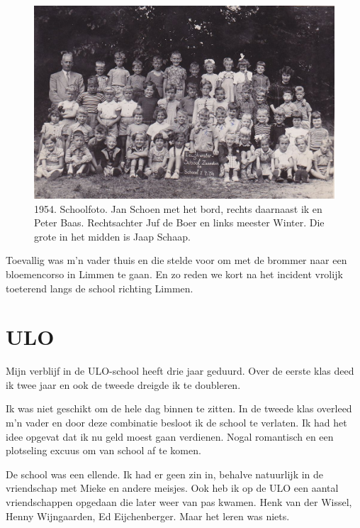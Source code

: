 \documentclass[12pt,twoside, openright]{memoir}
\begin{document}
\begin{figure}
\centering
\includegraphics[width=\textwidth]{img/ch18/lwschool}
\caption*{\footnotesize 1954. Schoolfoto. Jan Schoen met het bord, rechts daarnaast ik en Peter Baas. Rechtsachter Juf de Boer en links meester Winter. Die grote in het midden is Jaap Schaap.}
\end{figure}

Toevallig was m’n vader thuis en die stelde voor om met de brommer naar een bloemencorso in Limmen te gaan. En zo reden we kort na het incident vrolijk toeterend langs de school richting Limmen. 


\section*{ULO} %
\label{cha:ulo}

Mijn verblijf in de ULO-school heeft drie jaar geduurd. Over de eerste klas deed ik twee jaar en ook de tweede dreigde ik te doubleren. 

Ik was niet geschikt om de hele dag binnen te zitten. In de tweede klas overleed m’n vader en door deze combinatie besloot ik de school te verlaten. Ik had het idee opgevat dat ik nu geld moest gaan verdienen. Nogal romantisch en een plotseling excuus om van school af te komen.  

De school was een ellende. Ik had er geen zin in, behalve natuurlijk in de vriendschap met Mieke en andere meisjes. Ook heb ik op de ULO een aantal vriendschappen opgedaan die later weer van pas kwamen. Henk van der Wissel, Henny Wijngaarden, Ed Eijchenberger. Maar het leren was niets. 
\end{document}
